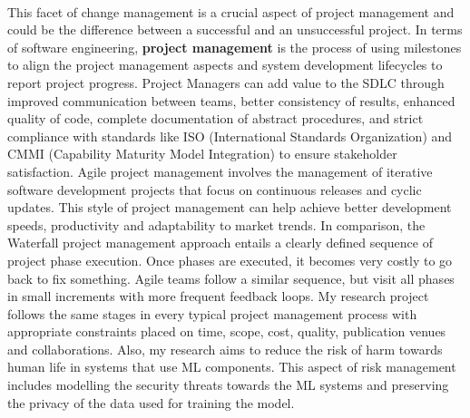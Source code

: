 \documentclass[11pt]{article}
\begin{document}
\\
\par{This facet of change management is a crucial aspect of project management and could be the difference between a successful and an unsuccessful project. In terms of software engineering, \textbf{project management} is the process of using milestones to align the project management aspects and system development lifecycles to report project progress. Project Managers can add value to the SDLC through improved communication between teams, better consistency of results, enhanced quality of code, complete documentation of abstract procedures, and strict compliance with standards like ISO (International Standards Organization) and CMMI (Capability Maturity Model Integration) to ensure stakeholder satisfaction. Agile project management involves the management of iterative software development projects that focus on continuous releases and cyclic updates. This style of project management can help achieve better development speeds, productivity and adaptability to market trends. In comparison, the Waterfall project management approach entails a clearly defined sequence of project phase execution. Once phases are executed, it becomes very costly to go back to fix something. Agile teams follow a similar sequence, but visit all phases in small increments with more frequent feedback loops. My research project follows the same stages in every typical project management process with appropriate constraints placed on time, scope, cost, quality, publication venues and collaborations. Also, my research aims to reduce the risk of harm towards human life in systems that use ML components. This aspect of risk management includes modelling the security threats towards the ML systems and preserving the privacy of the data used for training the model.}
\\
\end{document}
